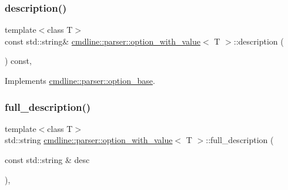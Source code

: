 \subsubsection{\texorpdfstring{description()}{description()}}
{\footnotesize\ttfamily template$<$class T$>$ \\
const std\+::string\& \mbox{\hyperlink{classcmdline_1_1parser_1_1option__with__value}{cmdline\+::parser\+::option\+\_\+with\+\_\+value}}$<$ T $>$\+::description (\begin{DoxyParamCaption}{ }\end{DoxyParamCaption}) const\hspace{0.3cm}{\ttfamily [inline]}, {\ttfamily [virtual]}}



Implements \mbox{\hyperlink{classcmdline_1_1parser_1_1option__base_adf2d7c92405305411ab6bc0d0b860d61}{cmdline\+::parser\+::option\+\_\+base}}.

\mbox{\label{classcmdline_1_1parser_1_1option__with__value_aa7dd340235afd5dd99b5d70692d8346c}} 
\subsubsection{\texorpdfstring{full\_description()}{full\_description()}}
{\footnotesize\ttfamily template$<$class T$>$ \\
std\+::string \mbox{\hyperlink{classcmdline_1_1parser_1_1option__with__value}{cmdline\+::parser\+::option\+\_\+with\+\_\+value}}$<$ T $>$\+::full\+\_\+description (\begin{DoxyParamCaption}\item[{const std\+::string \&}]{desc }\end{DoxyParamCaption})\hspace{0.3cm}{\ttfamily [inline]}, {\ttfamily [protected]}}

\mbox{\label{classcmdline_1_1parser_1_1option__with__value_aa7d8a57e2ad1aa3733098781d351af0a}} 
